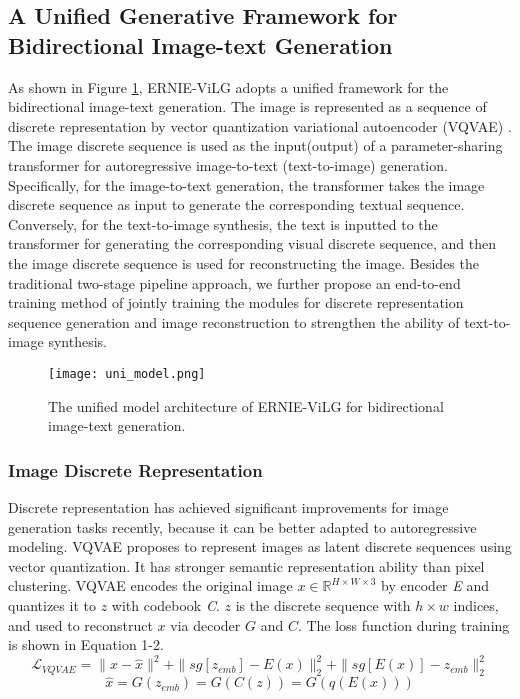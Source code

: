 \documentclass{article}
\begin{document}
\subsection{A Unified Generative Framework for Bidirectional Image-text Generation}
As shown in Figure \ref{fig:bimodel}, ERNIE-ViLG adopts a unified framework for the bidirectional image-text generation. The image is represented as a sequence of discrete representation by vector quantization variational autoencoder (VQVAE) \cite{oord2017neural}. 
The image discrete sequence is used as the input(output) of a parameter-sharing transformer for autoregressive image-to-text (text-to-image) generation.
Specifically, for the image-to-text generation, the transformer takes the image discrete sequence as input to generate the corresponding textual sequence. Conversely, for the text-to-image synthesis, the text is inputted to the transformer for generating the corresponding visual discrete sequence, and then the image discrete sequence is used for reconstructing the image. Besides the traditional two-stage pipeline approach, we further propose an end-to-end training method of jointly training the modules for discrete representation sequence generation and image reconstruction to strengthen the ability of text-to-image synthesis.
\begin{figure}[htb]
  \centering
  \texttt{[image: uni\_model.png]}
  \caption{The unified model architecture of ERNIE-ViLG for bidirectional image-text generation.}
  \label{fig:bimodel}
\end{figure}
\subsubsection{Image Discrete Representation}
Discrete representation has achieved significant improvements for image generation tasks recently, because it can be better adapted to autoregressive modeling. VQVAE \cite{oord2017neural} proposes to represent images as latent discrete sequences using vector quantization. It has stronger semantic representation ability than pixel clustering. VQVAE encodes the original image $x \in \mathbb{R}^{H \times W \times 3}$ by encoder \textit{E} and quantizes it to $z$ with codebook \textit{C}. $z$ is the discrete sequence with $h \times w$ indices, and used to reconstruct $x$ via decoder $G$ and $C$. The loss function during training is shown in Equation 1-2.
\begin{equation}
\mathcal{L} _{VQVAE}=\parallel x-\hat{x} \parallel^2+\parallel sg[z_{emb}] - E(x)\parallel^2_2 +\parallel sg[E(x)] - z_{emb}\parallel^2_2
\end{equation}
\begin{equation}
\hat{x}=G(z_{emb})= G(C(z)) = G(q(E(x)))
\end{equation}
\end{document}
